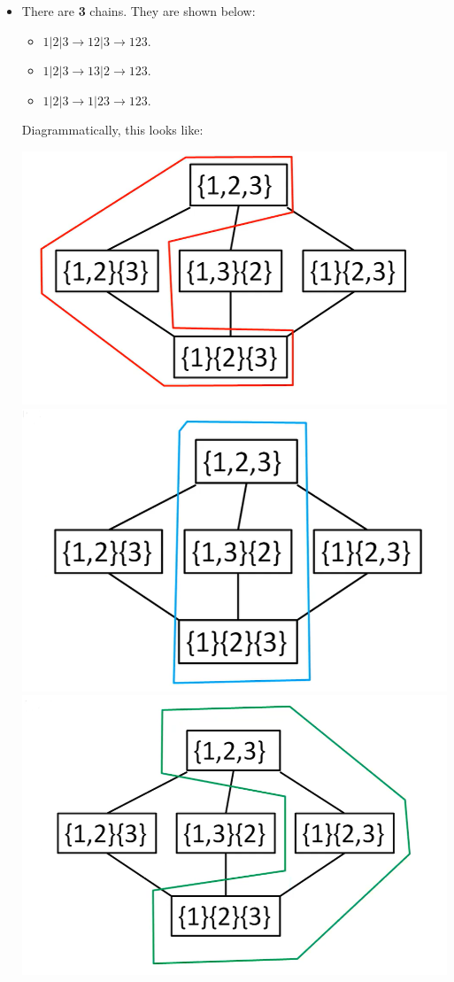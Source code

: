 \documentclass[letterpaper]{article}
\begin{document}
\begin{itemize}
    \item There are \textbf{3} chains. They are shown below:
    \begin{itemize}
        \item $1|2|3 \to 12|3 \to 123$.
        \item $1|2|3 \to 13|2 \to 123$.
        \item $1|2|3 \to 1|23 \to 123$.
    \end{itemize}
    Diagrammatically, this looks like:
    \begin{center}
        \includegraphics[scale=0.25]{img/hasse_1.PNG}
        \includegraphics[scale=0.25]{img/hasse_2.PNG}
        \includegraphics[scale=0.25]{img/hasse_3.PNG}

\end{center}
\end{itemize}
\end{document}

